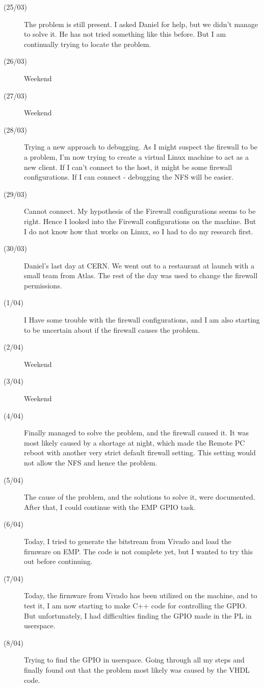 \begin{description}
\item[(25/03)] The problem is still present. I asked Daniel for help, but we didn't manage to solve it. He has not tried something like this before. But I am continually trying to locate the problem.   
\item[(26/03)] Weekend
\item[(27/03)] Weekend
\item[(28/03)] Trying a new approach to debugging. As I might suspect the firewall to be a problem, I'm now trying to create a virtual Linux machine to act as a new client. If I can't connect to the host, it might be some firewall configurations. If I can connect - debugging the NFS will be easier.
\item[(29/03)] Cannot connect. My hypothesis of the Firewall configurations seems to be right. Hence I looked into the Firewall configurations on the machine. But I do not know how that works on Linux, so I had to do my research first.
\item[(30/03)] Daniel's last day at CERN. We went out to a restaurant at launch with a small team from Atlas. The rest of the day was used to change the firewall permissions. 
\item[(1/04)] I Have some trouble with the firewall configurations, and I am also starting to be uncertain about if the firewall causes the problem. 
\item[(2/04)] Weekend
\item[(3/04)] Weekend
\item[(4/04)] Finally managed to solve the problem, and the firewall caused it. It was most likely caused by a shortage at night, which made the Remote PC reboot with another very strict default firewall setting. This setting would not allow the NFS and hence the problem.  
\item[(5/04)] The cause of the problem, and the solutions to solve it, were documented. After that, I could continue with the EMP GPIO task.
\item[(6/04)] Today, I tried to generate the bitstream from Vivado and load the firmware on EMP. The code is not complete yet, but I wanted to try this out before continuing. 
\item[(7/04)] Today, the firmware from Vivado has been utilized on the machine, and to test it, I am now starting to make C++ code for controlling the GPIO. But unfortunately, I had difficulties finding the GPIO made in the PL in userspace.
\item[(8/04)] Trying to find the GPIO in userspace. Going through all my steps and finally found out that the problem most likely was caused by the VHDL code. 

\end{description}
